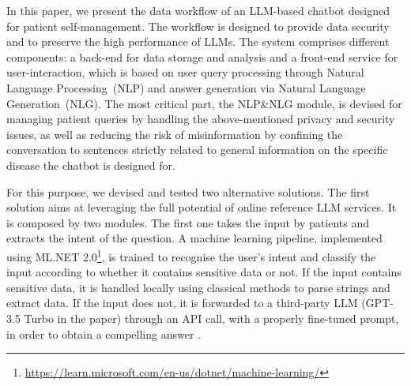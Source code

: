 In this paper, we present the data workflow of an LLM-based chatbot designed for patient self-management.
%
The workflow is designed to provide data security and to preserve the high performance of LLMs.
%
The system comprises different components: a back-end for data storage and analysis and a front-end service for user-interaction, which is based on user query processing through Natural Language Processing~(NLP) and answer generation via Natural Language Generation~(NLG).
%
The most critical part, the NLP\&NLG module, is devised for managing patient queries by handling the above-mentioned privacy and security issues, as well as reducing the risk of misinformation by confining the conversation to sentences strictly related to general information on the specific disease the chatbot is designed for.
  
For this purpose, we devised and tested two alternative solutions.
%
%
%
The first solution aims at leveraging the full potential of online reference LLM services.
%
It is composed by two modules.
%
The first one takes the input by patients and extracts the intent of the question. 
%
A machine learning pipeline, implemented using ML.NET 2.0\footnote{\url{https://learn.microsoft.com/en-us/dotnet/machine-learning/}}, is trained to recognise the user's intent and classify the input according to whether it contains sensitive data or not. 
%
If the input contains sensitive data, it is handled locally using classical methods to parse strings and extract data. 
%
If the input does not, it is forwarded to a third-party LLM (GPT-3.5 Turbo in the paper)  through an API call, with a properly fine-tuned prompt, in order to obtain a compelling answer \cite{MontagnaGoodIT2023}.
%
%
%
%
%

